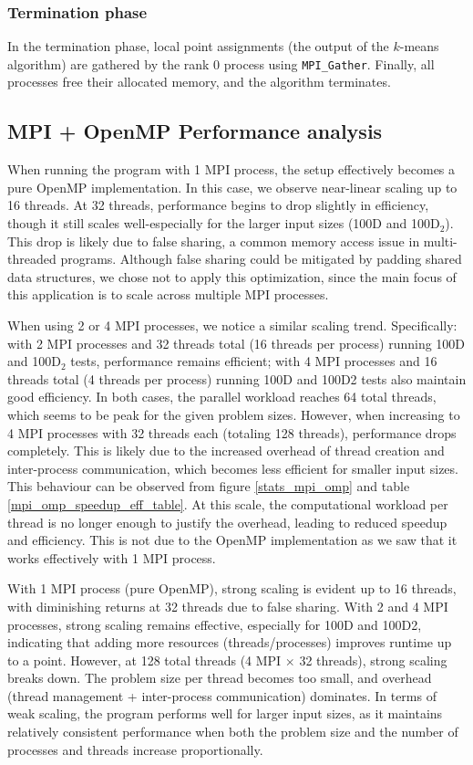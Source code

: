 \documentclass[11pt, journal]{IEEEtran}
\newcommand{\nwl}{

\vspace{11pt}

}
\begin{document}
\subsubsection{Termination phase}
In the termination phase, local point assignments (the output of the $k$-means algorithm) are gathered by the rank 0 process using \verb|MPI_Gather|. Finally, all processes free their allocated memory, and the algorithm terminates.

\subsection{MPI + OpenMP Performance analysis}

When running the program with 1 MPI process, the setup effectively becomes a pure OpenMP implementation. In this case, we observe near-linear scaling up to 16 threads. At 32 threads, performance begins to drop slightly in efficiency, though it still scales well-especially for the larger input sizes (100D and 100D$_2$). This drop is likely due to false sharing, a common memory access issue in multi-threaded programs. Although false sharing could be mitigated by padding shared data structures, we chose not to apply this optimization, since the main focus of this application is to scale across multiple MPI processes.
\nwl
When using 2 or 4 MPI processes, we notice a similar scaling trend. Specifically: with 2 MPI processes and 32 threads total (16 threads per process) running 100D and 100D$_2$ tests, performance remains efficient; with 4 MPI processes and 16 threads total (4 threads per process) running  100D and 100D2 tests also maintain good efficiency. In both cases, the parallel workload reaches 64 total threads, which seems to be peak for the given problem sizes. However, when increasing to 4 MPI processes with 32 threads each (totaling 128 threads), performance drops completely. This is likely due to the increased overhead of thread creation and inter-process communication, which becomes less efficient for smaller input sizes. This behaviour can be observed from figure \ref{stats_mpi_omp} and table \ref{mpi_omp_speedup_eff_table}. At this scale, the computational workload per thread is no longer enough to justify the overhead, leading to reduced speedup and efficiency. This is not due to the OpenMP implementation as we saw that it works effectively with 1 MPI process.
\nwl
With 1 MPI process (pure OpenMP), strong scaling is evident up to 16 threads, with diminishing returns at 32 threads due to false sharing. With 2 and 4 MPI processes, strong scaling remains effective, especially for 100D and 100D2, indicating that adding more resources (threads/processes) improves runtime up to a point. However, at 128 total threads (4 MPI $\times$ 32 threads), strong scaling breaks down. The problem size per thread becomes too small, and overhead (thread management + inter-process communication) dominates.
In terms of weak scaling, the program performs well for larger input sizes, as it maintains relatively consistent performance when both the problem size and the number of processes and threads increase proportionally.
\end{document}
